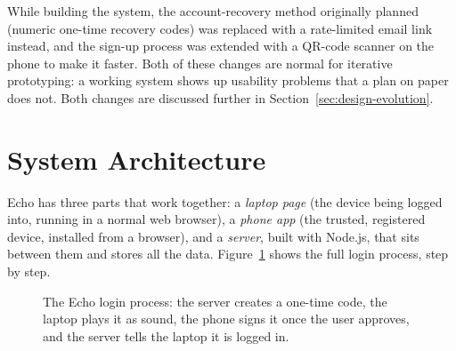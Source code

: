 While building the system, the account-recovery method originally planned
(numeric one-time recovery codes) was replaced with a rate-limited email
link instead, and the sign-up process was extended with a QR-code scanner
on the phone to make it faster. Both of these changes are normal for
iterative prototyping: a working system shows up usability problems that a
plan on paper does not. Both changes are discussed further in
Section~\ref{sec:design-evolution}.

\section{System Architecture}
\label{sec:architecture}

Echo has three parts that work together: a \emph{laptop page} (the device
being logged into, running in a normal web browser), a \emph{phone app}
(the trusted, registered device, installed from a browser), and a
\emph{server}, built with Node.js, that sits between them and stores all
the data. Figure~\ref{fig:architecture} shows the full login process, step
by step.

\begin{figure}[htbp]
\centering
{}
\caption{The Echo login process: the server creates a one-time code, the laptop plays it as sound, the phone signs it once the user approves, and the server tells the laptop it is logged in.}
\label{fig:architecture}
\end{figure}

